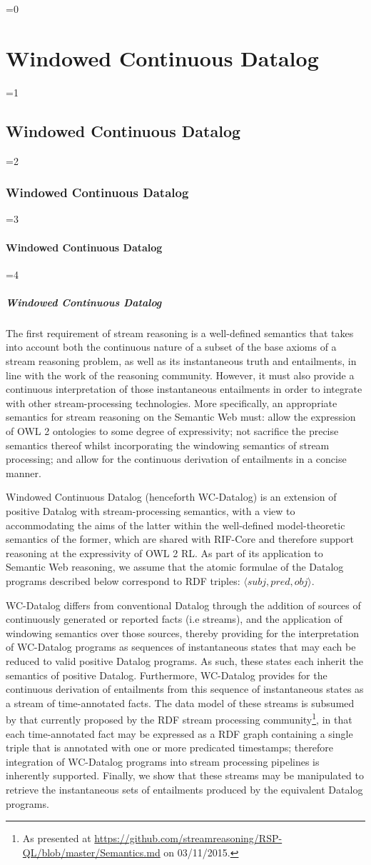 \documentclass[twocolumn,preprint,3p,number]{elsarticle}
\theoremstyle{plain}
\theoremstyle{definition}
\newcounter{nestingdepth}
\newenvironment{nestedsection}[2]{
  \ifnum\value{nestingdepth}=0
    \chapter{#1}
  \else
    \ifnum\value{nestingdepth}=1
      \section{#1}
    \else
      \ifnum\value{nestingdepth}=2
        \subsection{#1}
      \else
        \ifnum\value{nestingdepth}=3
          \subsubsection{#1}
        \else
          \ifnum\value{nestingdepth}=4
            \paragraph{#1}
          \else
            \PackageError{nestedsections}{Maximum nesting level exceeded!}{uh oh!}
          \fi
        \fi
      \fi
    \fi
  \fi
  \addtocounter{nestingdepth}{1}
  \label{sec:#2}
}{\addtocounter{nestingdepth}{-1}}
\begin{document}
\begin{nestedsection}{Windowed Continuous Datalog}{semantics}
The first requirement of stream reasoning is a well-defined semantics
that takes into account both the continuous nature of a subset of the
base axioms of a stream reasoning problem, as well as its
instantaneous truth and entailments, in line with the work of the
reasoning community.  However, it must also provide a continuous
interpretation of those instantaneous entailments in order to
integrate with other stream-processing technologies.  More
specifically, an appropriate semantics for stream reasoning on the
Semantic Web must: allow the expression of OWL 2 ontologies to some
degree of expressivity; not sacrifice the precise semantics thereof
whilst incorporating the windowing semantics of stream processing; and allow for
the continuous derivation of entailments in a concise manner.

Windowed Continuous Datalog (henceforth WC-Datalog) is an extension of positive
Datalog with stream-processing semantics, with a view to accommodating
the aims of the latter within the well-defined model-theoretic
semantics of the former, which are shared with RIF-Core
\cite{w3crifbld} and therefore support reasoning at the expressivity
of OWL 2 RL. As part of its application to Semantic Web reasoning, we
assume that the atomic formulae of the Datalog programs described
below correspond to RDF triples: $\langle subj, pred, obj\rangle$.

WC-Datalog differs from conventional Datalog through the addition of
sources of continuously generated or reported facts (i.e streams), and
the application of windowing semantics over those sources,
thereby providing for the interpretation of WC-Datalog programs as
sequences of instantaneous states that may each be reduced to valid positive Datalog
programs.  As such, these states each inherit the semantics of
positive Datalog.  Furthermore, WC-Datalog provides for the continuous derivation
of entailments from this sequence of instantaneous states as a stream
of time-annotated facts. The data model of these streams is subsumed by that currently proposed
by the RDF stream processing community\footnote{As presented at
\url{https://github.com/streamreasoning/RSP-QL/blob/master/Semantics.md}
on \mbox{03/11/2015}.}, in that each time-annotated fact may be expressed as a
RDF graph containing a single triple that is annotated with one or more
predicated timestamps; therefore integration of WC-Datalog programs
into stream processing pipelines is inherently supported. Finally, we show that these streams may be
manipulated to retrieve the instantaneous sets of entailments produced
by the equivalent Datalog programs.


\end{nestedsection}
\end{document}

